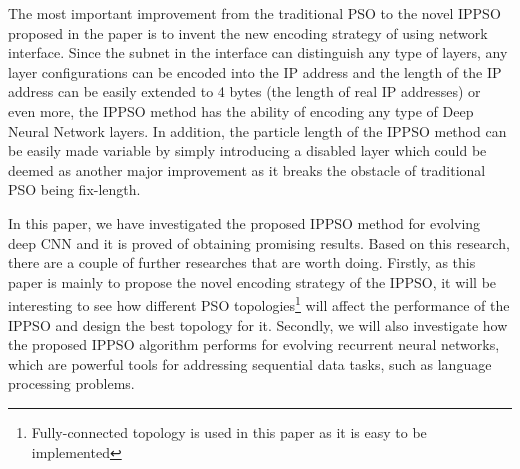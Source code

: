 \documentclass[conference]{IEEEtran}
\begin{document}
The most important improvement from the traditional PSO to the novel IPPSO proposed in the paper is to invent the new encoding strategy of using network interface. Since the subnet in the interface can distinguish any type of layers, any layer configurations can be encoded into the IP address and the length of the IP address can be easily extended to 4 bytes (the length of real IP addresses) or even more, the IPPSO method has the ability of encoding any type of Deep Neural Network layers. In addition, the particle length of the IPPSO method can be easily made variable by simply introducing a disabled layer which could be deemed as another major improvement as it breaks the obstacle of traditional PSO being fix-length. 


In this paper, we have investigated the proposed IPPSO method for evolving deep CNN and it is proved of obtaining promising results. Based on this research, there are a couple of further researches that are worth doing. Firstly, as this paper is mainly to propose the novel encoding strategy of the IPPSO, it will be interesting to see how different PSO topologies\footnote{Fully-connected topology is used in this paper as it is easy to be implemented} will affect the performance of the IPPSO and design the best topology for it. Secondly, we will also investigate how the proposed IPPSO algorithm performs for evolving recurrent neural networks, which are powerful tools for addressing sequential data tasks, such as language processing problems.











\end{document}
